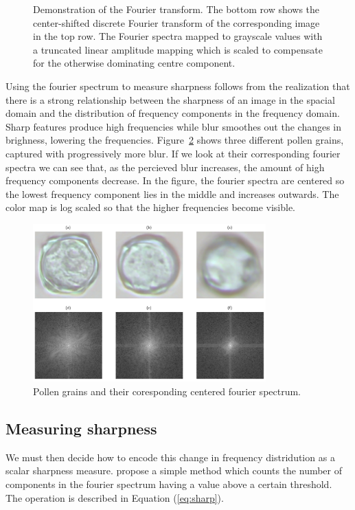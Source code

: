 \begin{figure}[htbp]
\begin{subfigure}[t]{0.2\textwidth}
  \end{subfigure}
  \caption[Demonstration of the Fourier transform]{
    Demonstration of the Fourier transform. The bottom row shows the center-shifted discrete Fourier transform of the corresponding image in the top row. The Fourier spectra mapped to grayscale values with a truncated linear amplitude mapping which is scaled to compensate for the otherwise dominating centre component.}\label{fig:fourier-demo}
\end{figure}

Using the fourier spectrum to measure sharpness follows from the realization that there is a strong relationship between the sharpness of an image in the spacial domain and the distribution of frequency components in the frequency domain.
Sharp features produce high frequencies while blur smoothes out the changes in brighness, lowering the frequencies.
Figure~\ref{fig:fourier} shows three different pollen grains, captured with progressively more blur.
If we look at their corresponding fourier spectra we can see that, as the percieved blur increases, the amount of high frequency components decrease.
In the figure, the fourier spectra are centered so the lowest frequency component lies in the middle and increases outwards.
The color map is log scaled so that the higher frequencies become visible.

\begin{figure}[htbp]
  \centering
  \includegraphics[width=0.8\textwidth]{figs/fourier.png}
  \caption[Fourier spectrum]{Pollen grains and their coresponding centered fourier spectrum.}\label{fig:fourier}
\end{figure}

\subsection{Measuring sharpness}
We must then decide how to encode this change in frequency distridution as a scalar sharpness measure.
\citeauthor{de2013image} propose a simple method which counts the number of components in the fourier spectrum having a value above a certain threshold.
The operation is described in Equation (\ref{eq:sharp}).


